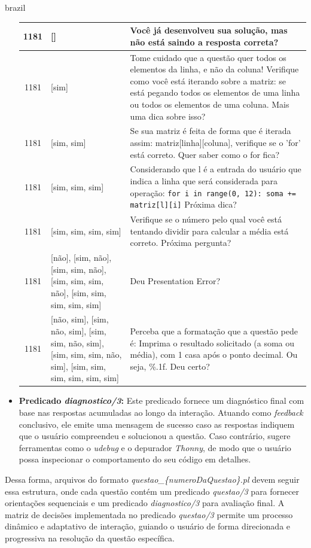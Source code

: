 \begin{otherlanguage*}{brazil}
\begin{itemize}
\begin{longtable}{|c|p{5cm}|p{8cm}|}
        1181 & [] & Você já desenvolveu sua solução, mas não está saindo a resposta correta? \\
        \hline
        1181 & [sim] & Tome cuidado que a questão quer todos os elementos da linha, e não da coluna! Verifique como você está iterando sobre a matriz: se está pegando todos os elementos de uma linha ou todos os elementos de uma coluna. Mais uma dica sobre isso? \\
        \hline
        1181 & [sim, sim] & Se sua matriz é feita de forma que é iterada assim: matriz[linha][coluna], verifique se o 'for' está correto. Quer saber como o for fica? \\
        \hline
        1181 & [sim, sim, sim] & Considerando que l é a entrada do usuário que indica a linha que será considerada para operação: \texttt{for i in range(0, 12): soma += matriz[l][i]} \newline Próxima dica? \\
        \hline
        1181 & [sim, sim, sim, sim] & Verifique se o número pelo qual você está tentando dividir para calcular a média está correto. Próxima pergunta? \\
        \hline
        1181 & [não], [sim, não], [sim, sim, não], [sim, sim, sim, não], [sim, sim, sim, sim, sim] & Deu Presentation Error? \\
        \hline
        1181 & [não, sim], [sim, não, sim], [sim, sim, não, sim], [sim, sim, sim, não, sim], [sim, sim, sim, sim, sim, sim] & Perceba que a formatação que a questão pede é: Imprima o resultado solicitado (a soma ou média), com 1 casa após o ponto decimal. Ou seja, \%.1f. Deu certo? \\
      \end{longtable}
    
    \item \textbf{Predicado \textit{diagnostico/3}:} Este predicado fornece um diagnóstico final com base nas respostas acumuladas ao longo da interação. Atuando como \textit{feedback} conclusivo, ele emite uma mensagem de sucesso caso as respostas indiquem que o usuário compreendeu e solucionou a questão. Caso contrário, sugere ferramentas como o \textit{udebug} e o depurador \textit{Thonny}, de modo que o usuário possa inspecionar o comportamento do seu código em detalhes.
\end{itemize}

Dessa forma, arquivos do formato \textit{questao\_\{numeroDaQuestao\}.pl} devem seguir essa estrutura, onde cada questão contém um predicado \textit{questao/3} para fornecer orientações sequenciais e um predicado \textit{diagnostico/3} para avaliação final. A matriz de decisões implementada no predicado \textit{questao/3} permite um processo dinâmico e adaptativo de interação, guiando o usuário de forma direcionada e progressiva na resolução da questão específica.


\end{otherlanguage*}
